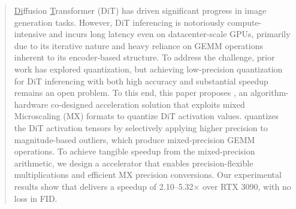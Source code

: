 \begin{abstract}
%
\underline{Di}ffusion \underline{T}ransformer (DiT) has driven significant progress in image generation tasks.
%
However, DiT inferencing is notoriously compute-intensive and incurs long latency even on datacenter-scale GPUs, primarily due to its iterative nature and heavy reliance on GEMM operations inherent to its encoder-based structure.
%
To address the challenge, prior work has explored quantization, but achieving low-precision quantization for DiT inferencing with both high accuracy and substantial speedup remains an open problem.
%
To this end, this paper proposes \sysname, an algorithm-hardware co-designed acceleration solution that exploits mixed Microscaling (MX) formats to quantize DiT activation values. 
%
\sysname quantizes the DiT activation tensors by selectively applying higher precision to magnitude-based outliers, which produce mixed-precision GEMM operations.
%
To achieve tangible speedup from the mixed-precision arithmetic, we design a \sysname accelerator that enables precision-flexible multiplications and efficient MX precision conversions.
%
Our experimental results show that \sysname delivers a speedup of 2.10–5.32$\times$ over RTX 3090, with no loss in FID.
%
\end{abstract}